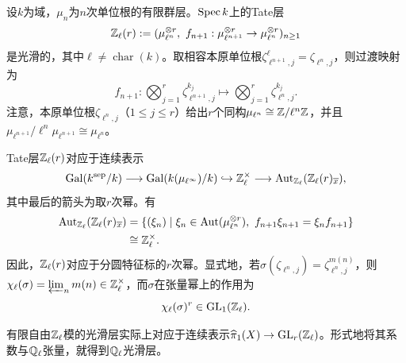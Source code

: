 \begin{example}\label{L11S1O2}
设$k$为域，$\mu_n$为$n$次单位根的有限群层。$\operatorname{Spec} k$上的Tate层
\[\Z_\ell(r):=(\mu_{\ell^n}^{\otimes r},\ f_{n+1}:\mu_{\ell^{n+1}}^{\otimes r}\to\mu_{\ell^n}^{\otimes r})_{n\geq1}\]
是光滑的，其中$\ell\ne\operatorname{char}(k)$。取相容本原单位根$\zeta_{\ell^{n+1},j}^\ell=\zeta_{\ell^n,j}$，则过渡映射为
\[f_{n+1}:\bigotimes_{j=1}^r\zeta_{\ell^{n+1},j}^{k_j}\longmapsto\bigotimes_{j=1}^r\zeta_{\ell^n,j}^{k_j}.\]
注意，本原单位根$\zeta_{\ell^n,j}$（$1\leq j\leq r$）给出$r$个同构$\mu_{\ell^n}\cong\mathbb{Z}/\ell^n\mathbb{Z}$，并且$\mu_{\ell^{n+1}}/\ell^n\mu_{\ell^{n+1}}\cong\mu_{\ell^n}$。

Tate层$\mathbb{Z}_\ell(r)$对应于连续表示
\[\operatorname{Gal}(k^{\mathrm{sep}}/k)\longrightarrow\operatorname{Gal}(k(\mu_{\ell^\infty})/k)\hookrightarrow\mathbb{Z}_\ell^\times\longrightarrow\operatorname{Aut}_{\mathbb{Z}_\ell}(\mathbb{Z}_\ell(r)_{\overline x}),\]
其中最后的箭头为取$r$次幂。有
\[\begin{aligned}
\operatorname{Aut}_{\mathbb{Z}_\ell}(\mathbb{Z}_\ell(r)_{\overline x})
&=\{(\xi_n)\mid\xi_n\in\operatorname{Aut}(\mu_{\ell^n}^{\otimes r}),\ f_{n+1}\xi_{n+1}=\xi_nf_{n+1}\}\\
&\cong\mathbb{Z}_\ell^\times.
\end{aligned}\]
因此，$\mathbb{Z}_\ell(r)$对应于分圆特征标的$r$次幂。显式地，若$\sigma(\zeta_{\ell^n,j})=\zeta_{\ell^n,j}^{m(n)}$，则$\chi_\ell(\sigma)=\varprojlim_nm(n)\in\mathbb{Z}_\ell^\times$，而$\sigma$在张量幂上的作用为
\[\chi_\ell(\sigma)^r\in\operatorname{GL}_1(\mathbb{Z}_\ell).\]
\end{example}
有限自由$\mathbb{Z}_\ell$模的光滑层实际上对应于连续表示$\widehat\pi_1(X)\to\operatorname{GL}_r(\mathbb{Z}_\ell)$。形式地将其系数与$\mathbb{Q}_\ell$张量，就得到$\mathbb{Q}_\ell$光滑层。

